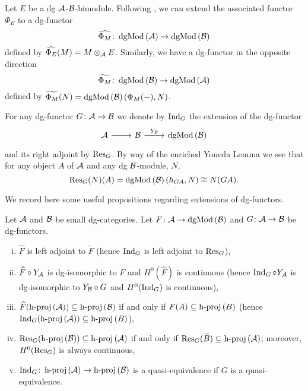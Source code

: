 Let \(E\) be a dg \(\mathcal{A}\)-\(\mathcal{B}\)-bimodule.
Following \textcite[Section 3]{CS15}, we can extend the associated functor \(\Phi_E\) to a dg-functor
\[\widehat{\Phi_M} \colon \operatorname{dgMod}\left(\mathcal{A}\right) \to \operatorname{dgMod}\left(\mathcal{B}\right)\]
defined by \(\widehat{\Phi_E}(M) = M \otimes_{\mathcal{A}} E\).
Similarly, we have a dg-functor in the opposite direction
\[\widetilde{\Phi_M} \colon \operatorname{dgMod}\left(\mathcal{B}\right) \to \operatorname{dgMod}\left(\mathcal{A}\right)\]
defined by \(\widetilde{\Phi_M}(N) = \operatorname{dgMod}\left(\mathcal{B}\right)(\Phi_M( - ), N)\).

For any dg-functor \(G \colon \mathcal{A} \to \mathcal{B}\) we denote by \(\operatorname{Ind}_{G}\) the extension of the dg-functor
\[\begin{tikzcd}
\A  \arrow{r} & \B \arrow{r}{Y_\B} & \dgMod{\B}
\end{tikzcd}\]
and its right adjoint by \(\operatorname{Res}_{G}\).
By way of the enriched Yoneda Lemma we see that for any object \(A\) of \(\mathcal{A}\) and any dg \(\mathcal{B}\)-module, \(N\), 
\[\operatorname{Res}_{G}(N)(A) = \operatorname{dgMod}\left(\mathcal{B}\right)(h_{GA}, N) \cong N(GA).\]

We record here some useful propositions regarding extensions of dg-functors.

\begin{proposition}[{\textcite[Prop 3.2]{CS15}}]
  Let \(\mathcal{A}\) and \(\mathcal{B}\) be small dg-categories.
  Let \(F \colon \mathcal{A} \to \operatorname{dgMod}\left(\mathcal{B}\right)\) and \(G \colon \mathcal{A} \to \mathcal{B}\) be dg-functors.
  \begin{enumerate}[(i)]
  \item
    \(\widehat{F}\) is left adjoint to \(\widetilde{F}\) (hence \(\operatorname{Ind}_{G}\) is left adjoint to \(\operatorname{Res}_{G}\)),
  \item
    \(\widehat{F} \circ Y_{\mathcal{A}}\) is dg-isomorphic to \(F\) and \(H^0(\widehat{F})\) is continuous (hence \(\operatorname{Ind}_{G} \circ Y_{\mathcal{A}}\) is dg-isomorphic to \(Y_{\mathcal{B}} \circ G\) and \(H^0(\operatorname{Ind}_{G})\) is continuous),
  \item
    \(\widehat{F}(\operatorname{h-proj}\left(\mathcal{A}\right)) \subseteq \operatorname{h-proj}\left(\mathcal{B}\right)\) if and only if \(F(A) \subseteq \operatorname{h-proj}\left(B\right)\) (hence \(\operatorname{Ind}_{G}(\operatorname{h-proj}\left(\mathcal{A}\right)) \subseteq \operatorname{h-proj}\left(B\right)\)),
  \item
    \(\operatorname{Res}_{G}(\operatorname{h-proj}\left(\mathcal{B}\right)) \subseteq \operatorname{h-proj}\left(\mathcal{A}\right)\) if and only if \(\operatorname{Res}_{G}(\bar{B}) \subseteq \operatorname{h-proj}\left(\mathcal{A}\right)\); moreover,\\ \(H^0(\operatorname{Res}_{G})\) is always continuous,
  \item
    \(\operatorname{Ind}_{G} \colon \operatorname{h-proj}\left(\mathcal{A}\right) \to \operatorname{h-proj}\left(\mathcal{B}\right)\) is a quasi-equivalence if \(G\) is a quasi-equivalence.
  \end{enumerate}
\end{proposition}

